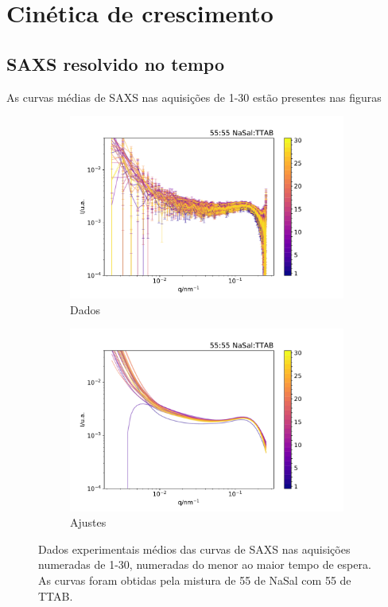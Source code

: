 	
\part{Cinética de crescimento}
	\chapter{SAXS resolvido no tempo}
	
	As curvas médias de SAXS nas aquisições de 1-30 estão presentes nas figuras 
	\begin{figure}[h]
		\begin{subfigure}[t]{0.5\textwidth}
			\centering
			\includegraphics[width=\textwidth]{imagens/saxs/TR_saxs_55_55_dados.pdf}
			\caption{Dados}
			\label{fig:saxs_tr_55_d}
		\end{subfigure}%
		\begin{subfigure}[t]{0.5\textwidth}
			\centering
			\includegraphics[width=\textwidth]{imagens/saxs/TR_saxs_55_55_ajuste.pdf}
			\caption{Ajustes}
			\label{fig:saxs_tr_55_a}
		\end{subfigure}
		\caption{Dados experimentais médios das curvas de SAXS nas aquisições numeradas de 1-30, numeradas do menor ao maior tempo de espera. As curvas foram obtidas pela mistura de 55 \mM{} de NaSal com 55\mM{} de TTAB.}
		\label{fig:saxs_tr_55}
	\end{figure} 

